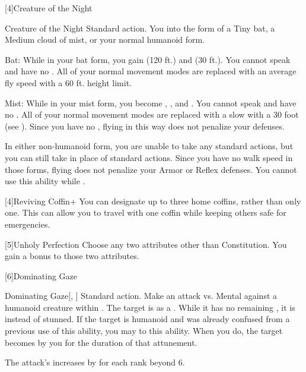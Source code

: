     [4]{Creature of the Night}
      \begin{magicalattuneability}{Creature of the Night}{}
        \abilityusagetime Standard action.
        \rankline
        You  into the form of a Tiny bat, a Medium cloud of mist, or your normal humanoid form.
        \begin{raggeditemize}
          \item Bat: While in your bat form, you gain  (120 ft.) and  (30 ft.).
            You cannot speak and have no .
            All of your normal movement modes are replaced with an average fly speed with a 60 ft. height limit.
          \item Mist: While in your mist form, you become , , and .
            You cannot speak and have no .
            All of your normal movement modes are replaced with a slow  with a 30 foot  (see ).
            Since you have no , flying in this way does not penalize your defenses.
        \end{raggeditemize}

        In either non-humanoid form, you are unable to take any standard actions, but you can still take  in place of standard actions.
        Since you have no walk speed in those forms, flying does not penalize your Armor or Reflex defenses.
        You cannot use this ability while \paralyzed.
      \end{magicalattuneability}

    [4]{Reviving Coffin+} You can designate up to three home coffins, rather than only one.
      This can allow you to travel with one coffin while keeping others safe for emergencies.

    [5]{Unholy Perfection} Choose any two attributes other than Constitution.
      You gain a  bonus to those two attributes.

    [6]{Dominating Gaze}
      \begin{magicalactiveability}{Dominating Gaze}[, ]
        \abilityusagetime Standard action.
        \rankline
        Make an attack vs. Mental against a humanoid creature within \shortrange.
        \hit The target is \stunned as a .
        While it has no remaining , it is \confused instead of stunned.
        \crit If the target is humanoid and was already confused from a previous use of this ability, you may  to this ability.
        When you do, the target becomes \dominated by you for the duration of that attunement.

        \rankline
        The attack's  increases by  for each rank beyond 6.
      \end{magicalactiveability}

